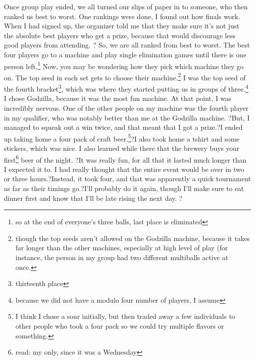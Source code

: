 \documentclass[12pt]{article}[titlepage]
\newcommand{\1}{\={a}}
\newcommand{\2}{\={e}}
\newcommand{\3}{\={\i}}
\newcommand{\4}{\=o}
\newcommand{\5}{\=u}
\newcommand{\6}{\={A}}
\renewcommand{\,}{\textsuperscript{,}}
\begin{document}
Once group play ended, we all turned our slips of paper in to someone, who then ranked us best to worst.
One rankings were done, I found out how finals work.
When I had signed up, the organizer told me that they make sure it's not just the absolute best players who get a prize, because that would discourage less good players from attending.
?
So, we are all ranked from best to worst.
The best four players go to a machine and play single elimination games until there is one person left.\footnote{so at the end of everyone's three balls, last place is eliminated}
Now, you may be wondering how they pick which machine they go on.
The top seed in each set gets to choose their machine.\footnote{though the top seeds aren't allowed on the Godzilla machine, because it takes far longer than the other machines, especially at high level of play (for instance, the person in my group had two different multiballs active at once.}
I was the top seed of the fourth bracket\footnote{thirteenth place}, which was where they started putting us in groups of three.\footnote{because we did not have a modulo four number of players, I assume}
I chose Godzilla, because it was the most fun machine.
At that point, I was incredibly nervous.
One of the other people on my machine was the fourth player in my qualifier, who was notably better than me at the Godzilla machine.
?But, I managed to squeak out a win twice, and that meant that I got a prize.?I ended up taking home a four pack of craft beer.\footnote{I think I chose a sour initially, but then traded away a few individuals to other people who took a four pack so we could try multiple flavors or something.}?I also took home a tshirt and some stickers, which was nice.
I also learned while there that the brewery buys your first\footnote{read: my only, since it was a Wednesday} beer of the night.
?It was really fun, for all that it lasted much longer than I expected it to.
I had really thought that the entire event would be over in two or three hours.?Instead, it took four, and that was apparently a quick tournament as far as their timings go.?I'll probably do it again, though I'll make sure to eat dinner first and know that I'll be late rising the next day.
?
\end{document}
